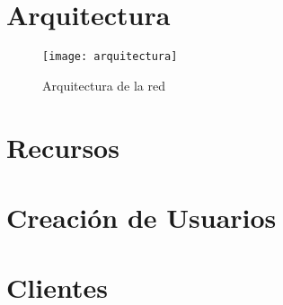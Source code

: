 \documentclass[letterpaper]{article}
\begin{document}


\tableofcontents{}

\newpage{}

\section{Arquitectura}\label{sec:arq}
\begin{figure}[h!]
  \texttt{[image: arquitectura]}
  \caption{Arquitectura de la red}\label{fig:arquitectura}
\end{figure}

\section{Recursos}\label{sec:recursos}



\newpage{}

\section{Creación de Usuarios}\label{sec:cusuarios}



\newpage{}

\section{Clientes}\label{sec:clientes}


\end{document}
